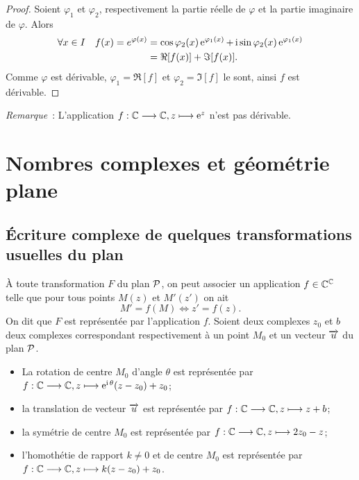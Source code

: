 \begin{proof}
    Soient \(\varphi_1\) et \(\varphi_2\), respectivement la partie réelle de 
    \(\varphi\) et la partie imaginaire de \(\varphi\). Alors
    \begin{align}
        \forall x \in I \quad f(x)=e^{\varphi(x)}&=\cos \varphi_2(x) 
        \e^{\varphi_1(x)}+ \ii \sin \varphi_2(x)\e^{\varphi_1(x)} \\
                                                 &= \Re[f(x)] + \Im[f(x)].
    \end{align}
    Comme \(\varphi\) est dérivable, \(\varphi_1=\Re[f]\) et 
    \(\varphi_2=\Im[f]\) le sont, ainsi \(f\) est dérivable.
\end{proof}
\emph{Remarque}~: L'application \(\fonctionL{f}{\C}{\C}{z}{\e^z}\) n'est pas 
dérivable.
\section{Nombres complexes et géométrie plane}
\label{sec:complexesetgeometrie}
\subsection{Écriture complexe de quelques transformations usuelles du plan}
\label{subsec:ecriturecomplexeettransformations}
À toute transformation \(F\) du plan \(\P\), on peut associer un application \(f 
\in \C^{\C}\) telle que pour tous points \(M(z)\) et \(M'(z')\) on ait
\begin{equation}
    M'=f(M) \iff z'=f(z).
\end{equation}
On dit que \(F\) est représentée par l'application \(f\). Soient deux complexes 
\(z_0\) et \(b\) deux complexes correspondant respectivement à un point \(M_0\) 
et un vecteur \(\vect{u}\) du plan \(\P\).
\begin{itemize}
    \item La rotation de centre \(M_0\) d'angle \(\theta\) est représentée par 
        \(\fonctionL{f}{\C}{\C}{z}{\expc{}{\theta}(z-z_0) +z_0}\);
    \item la translation de vecteur \(\vect{u}\) est représentée par 
        \(\fonctionL{f}{\C}{\C}{z}{z+b}\);
    \item la symétrie de centre \(M_0\) est représentée par 
        \(\fonctionL{f}{\C}{\C}{z}{2z_0-z}\);
    \item l'homothétie de rapport \(k\neq 0\) et de centre \(M_0\) est 
        représentée par \(\fonctionL{f}{\C}{\C}{z}{k(z-z_0)+z_0}\).
\end{itemize}
